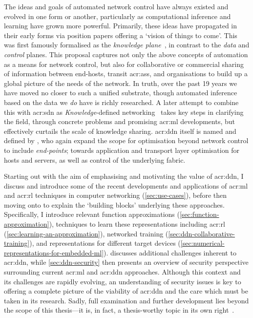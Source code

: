 The ideas and goals of automated network control have always existed and evolved in one form or another, particularly as computational inference and learning have grown more powerful.
Primarily, these ideas have propagated in their early forms via position papers offering a `vision of things to come'.
This was first famously formalised as the \emph{knowledge plane}~\parencite{DBLP:conf/sigcomm/ClarkPRW03}, in contrast to the \emph{data} and \emph{control} planes.
This proposal captures not only the above concepts of automation as a means for network control, but also for collaborative or commercial sharing of information between end-hosts, transit \glspl{acr:as}, and organisations to build up a global picture of the needs of the network.
In truth, over the past \num{19} years we have moved no closer to such a unified substrate, though automated inference based on the data we \emph{do} have is richly researched.
A later attempt to combine this with \gls{acr:sdn} as \emph{Knowledge}-defined networking~\parencite{DBLP:journals/corr/MestresRCBASMMB16} takes key steps in clarifying the field, through concrete problems and promising \gls{acr:ml} developments, but effectively curtails the scale of knowledge sharing.
\gls{acr:ddn} itself is named and defined by \Textcite{DBLP:conf/comsnets/JiangSSZ17}, who again expand the scope for optimisation beyond network control to include \emph{end-points}; towards application and transport layer optimisation for hosts and servers, as well as control of the underlying fabric.

Starting out with the aim of emphasising and motivating the value of \gls{acr:ddn}, I discuss and introduce some of the recent developments and applications of \gls{acr:ml} and \gls{acr:rl} techniques in computer networking (\cref{sec:use-cases}), before then moving onto to explain the `building blocks' underlying these approaches.
Specifically, I introduce relevant function approximations (\cref{sec:function-approximation}), techniques to learn these representations including \gls{acr:rl} (\cref{sec:learning-an-approximation}), networked training (\cref{sec:ddn-collaborative-training}), and representations for different target devices (\cref{sec:numerical-representations-for-embedded-ml}).
 discusses additional challenges inherent to \gls{acr:ddn}, while \cref{sec:ddn-security} then presents an overview of security perspective surrounding current \gls{acr:ml} and \gls{acr:ddn} approaches.
Although this context and its challenges are rapidly evolving, an understanding of security issues is key to offering a complete picture of the viability of \gls{acr:ddn} and the care which must be taken in its research.
Sadly, full examination and further development lies beyond the scope of this thesis---it is, in fact, a thesis-worthy topic in its own right~\parencite{papernot-thesis}.

